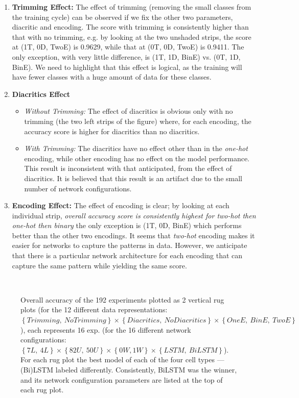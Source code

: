 \begin{enumerate}
 \item \textbf{Trimming Effect:} The effect of trimming (removing the small classes from the training cycle) can be observed if we fix the other two parameters, diacritic and encoding. The score with trimming is consistently higher than that with no trimming, e.g. by looking at the two unshaded strips, the score at (1T, 0D, TwoE) is 0.9629, while that at (0T, 0D, TwoE) is 0.9411. The only exception, with very little difference, is (1T, 1D, BinE) vs. (0T, 1D, BinE). We need to highlight that this effect is logical, as the training will have fewer classes with a huge amount of data for these classes.
 \item \textbf{Diacritics Effect}
 \begin{itemize}
 \item \textit{Without Trimming:} The effect of diacritics is obvious only with no trimming (the two left strips of the figure) where, for each encoding, the accuracy score is higher for diacritics than no diacritics.
 \item \textit{With Trimming:} The diacritics have no effect other than in the \textit{one-hot} encoding, while other encoding has no effect on the model performance. This result is inconsistent with that anticipated, from the effect of diacritics. It is believed that this result is an artifact due to the small number of network configurations.

 \end{itemize} 
 \item \textbf{Encoding Effect:} The effect of encoding is clear; by looking at each individual strip, \textit{overall accuracy score is consistently highest for \textit{two-hot} then \textit{one-hot} then \textit{binary}} the only exception is (1T, 0D, BinE) which performs better than the other two encodings. It seems that \textit{two-hot} encoding makes it easier for networks to capture the patterns in data. However, we anticipate that there is a particular network architecture for each encoding that can capture the same pattern while yielding the same score.
\end{enumerate}



\begin{figure}[!t]
 
 \caption{Overall accuracy of the 192 experiments plotted as 2 vertical rug plots (for the 12 different data representations: $\left\{\mathit{Trimming},\ \mathit{No Trimming} \right\} \times \left\{\mathit{Diacritics},\ \mathit{No Diacritics} \right\} \times \left\{\mathit{OneE},\ \mathit{BinE},\ \mathit{TwoE}\right\}$), each represents 16 exp. (for the 16 different network configurations: $\left\{7L,\ 4L\right\} \times \left\{82U,\ 50U\right\} \times \left\{0W, 1W\right\} \times \left\{LSTM,\ BiLSTM\right\}$). For each rug plot the best model of each of the four cell types ---(Bi)LSTM labeled differently. Consistently, BiLSTM was the winner, and its network configuration parameters are listed at the top of each rug plot.}~\label{Fig:ArabicModelsResults}
\end{figure}



